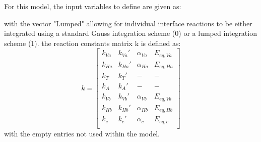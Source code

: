 \documentclass[3p]{elsarticle} %
\begin{document}
For this model, the input variables to define are given as:


with the vector "Lumped" allowing for individual interface reactions to be either integrated using a standard Gauss integration scheme (0) or a lumped integration scheme (1). the reaction constants matrix k is defined as:
\begin{equation}
	k = \begin{bmatrix} 
	k_{Va} & k_{Va}' & \alpha_{Va} & E_{eq,Va} \\ 
	k_{Ha} & k_{Ha}' & \alpha_{Ha} & E_{eq,Ha} \\ 
	k_{T} & k_{T}' & - & - \\ 
	k_{A} & k_{A}' & - & - \\ 
	k_{Vb} & k_{Vb}' & \alpha_{Vb} & E_{eq,Vb} \\ 
	k_{Hb} & k_{Hb}' & \alpha_{Hb} & E_{eq,Hb} \\ 
	k_{c} & k_{c}' & \alpha_{c} & E_{eq,c} \\ 
	\end{bmatrix} \label{eq:kmat}
\end{equation}
with the empty entries not used within the model.
\end{document}
